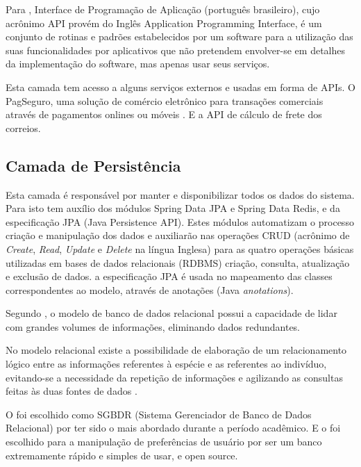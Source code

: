 \documentclass[a4paper,12pt]{monografia}
\begin{document}
Para , Interface de Programação de Aplicação (português brasileiro), cujo acrônimo API provém do Inglês Application Programming Interface, é um conjunto de rotinas e padrões estabelecidos por um software para a utilização das suas funcionalidades por aplicativos que não pretendem envolver-se em detalhes da implementação do software, mas apenas usar seus serviços.

Esta camada tem acesso a alguns serviços externos e usadas em forma de APIs. O PagSeguro, uma solução de comércio eletrônico para transações comerciais através de pagamentos onlines ou móveis \cite{pagseguro}. E a API de cálculo de frete dos correios.


\subsection{Camada de Persistência} %
\label{sub:camada_de_persistencia}

Esta camada é responsável por manter e disponibilizar todos os dados do sistema. Para isto tem auxílio dos módulos Spring Data JPA e Spring Data Redis, e da especificação JPA (Java Persistence API). Estes módulos automatizam o processo criação e manipulação dos dados e auxiliarão  nas operações CRUD (acrônimo de \textit{Create}, \textit{Read}, \textit{Update} e \textit{Delete} na língua Inglesa) para as quatro operações básicas utilizadas em bases de dados relacionais (RDBMS) criação, consulta, atualização e exclusão de dados. a especificação JPA é usada no mapeamento das classes correspondentes ao modelo, através de anotações (Java \textit{anotations}).

Segundo , o modelo de banco de dados relacional possui a capacidade de lidar com grandes volumes de informações, eliminando dados redundantes. 

\begin{citacao}
	No modelo relacional existe a possibilidade de elaboração de um relacionamento lógico entre as informações referentes à espécie e as referentes ao indivíduo, evitando-se a necessidade da repetição de informações e agilizando as consultas feitas às duas fontes de dados \cite{da2002banco}.
\end{citacao}

O  foi escolhido como SGBDR (Sistema Gerenciador de Banco de Dados Relacional) por ter sido o mais abordado durante a período acadêmico. E o  foi escolhido para a manipulação de preferências de usuário por ser um banco extremamente rápido e simples de usar, e open source.
\end{document}
